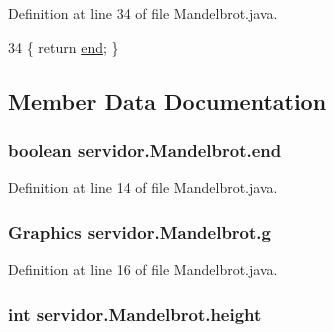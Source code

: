 Definition at line 34 of file Mandelbrot.\+java.


\begin{DoxyCode}
34 \{ \textcolor{keywordflow}{return} \hyperlink{classservidor_1_1Mandelbrot_a86091dfb72790ed3f95c45f0ec24d3c0}{end}; \}
\end{DoxyCode}


\subsection{Member Data Documentation}
\subsubsection[{\texorpdfstring{end}{end}}]{\setlength{\rightskip}{0pt plus 5cm}boolean servidor.\+Mandelbrot.\+end\hspace{0.3cm}{\ttfamily [private]}}\hypertarget{classservidor_1_1Mandelbrot_a86091dfb72790ed3f95c45f0ec24d3c0}{}\label{classservidor_1_1Mandelbrot_a86091dfb72790ed3f95c45f0ec24d3c0}


Definition at line 14 of file Mandelbrot.\+java.

\subsubsection[{\texorpdfstring{g}{g}}]{\setlength{\rightskip}{0pt plus 5cm}Graphics servidor.\+Mandelbrot.\+g\hspace{0.3cm}{\ttfamily [package]}}\hypertarget{classservidor_1_1Mandelbrot_afc3c91039c0345ef6a23b55eff765a03}{}\label{classservidor_1_1Mandelbrot_afc3c91039c0345ef6a23b55eff765a03}


Definition at line 16 of file Mandelbrot.\+java.

\subsubsection[{\texorpdfstring{height}{height}}]{\setlength{\rightskip}{0pt plus 5cm}int servidor.\+Mandelbrot.\+height\hspace{0.3cm}{\ttfamily [private]}}\hypertarget{classservidor_1_1Mandelbrot_a4d0130b58e95822c56b1b41274a84cff}{}\label{classservidor_1_1Mandelbrot_a4d0130b58e95822c56b1b41274a84cff}


